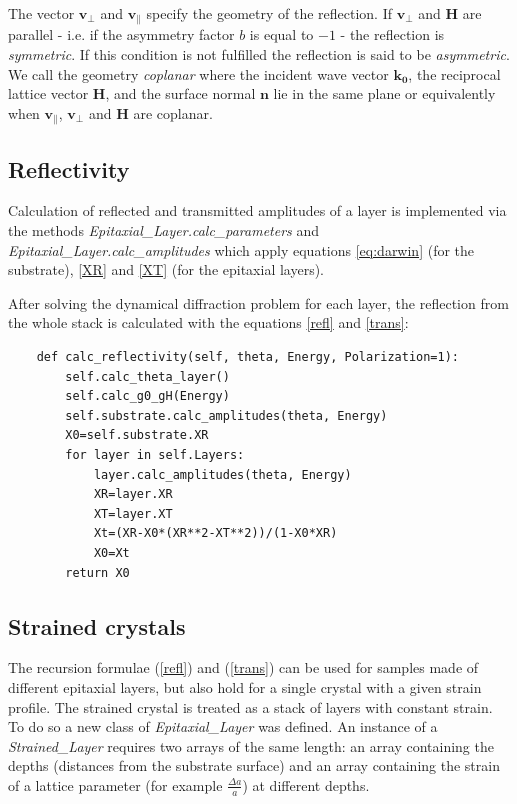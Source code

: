 \documentclass[12pt,oneside,notitlepage,abstracton,a4paper]{scrartcl}
\begin{document}
The vector $\mathbf{v_\perp}$ and $\mathbf{v_\parallel}$ specify the geometry of the reflection.
If $\mathbf{v_\perp}$ and $\mathbf{H}$ are parallel - i.e. if the asymmetry factor $b$ is equal to $-1$ - the reflection is \textit{symmetric}. If this condition is not fulfilled the reflection is said to be \textit{asymmetric}.
We call the geometry \textit{coplanar} where the incident wave vector $\mathbf{k_0}$, the reciprocal lattice vector $\mathbf{H}$, and the surface normal $\mathbf{n}$ lie in the same plane or equivalently when $\mathbf{v_\parallel}$, $\mathbf{v_\perp}$ and $\mathbf{H}$ are coplanar.



\subsection{Reflectivity}
Calculation of reflected and transmitted amplitudes of a layer is implemented via the methods \textit{Epitaxial\_Layer.calc\_parameters} and \textit{Epitaxial\_Layer.calc\_amplitudes} which apply equations \ref{eq:darwin} (for the substrate), \ref{XR} and \ref{XT} (for the epitaxial layers).

After solving the dynamical diffraction problem for each layer, the reflection from the whole stack is calculated with the equations \ref{refl} and \ref{trans}:
\begin{lstlisting}
    def calc_reflectivity(self, theta, Energy, Polarization=1):
        self.calc_theta_layer()
        self.calc_g0_gH(Energy)
        self.substrate.calc_amplitudes(theta, Energy)
        X0=self.substrate.XR
        for layer in self.Layers:
            layer.calc_amplitudes(theta, Energy)
            XR=layer.XR
            XT=layer.XT
            Xt=(XR-X0*(XR**2-XT**2))/(1-X0*XR)
            X0=Xt
        return X0
\end{lstlisting}


\subsection{Strained crystals} \label{strcr}
The recursion formulae (\ref{refl}) and (\ref{trans}) can be used for samples made of different epitaxial layers, but also hold for a single crystal with a given strain profile. The strained crystal is treated as a stack of layers with constant strain. To do so a new class of \textit{Epitaxial\_Layer} was defined. An instance of a \textit{Strained\_Layer} requires two arrays of the same length: an array containing the depths (distances from the substrate surface) and an array containing the strain of a lattice parameter (for example $\frac{\Delta a}{a}$) at different depths.
\end{document}

